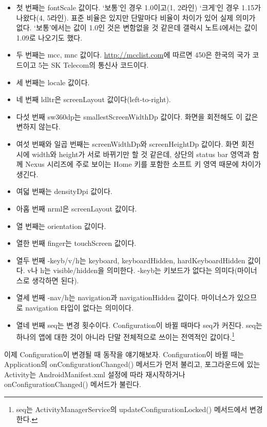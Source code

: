 \begin{itemize}
\item 첫 번째는 fontScale 값이다. `보통'인 경우 1.0이고(1, 2라인) `크게'인 경우 1.15가 나왔다(4, 5라인). 표준 비율은 있지만 단말마다 비율이 차이가 있어 실제 의미가 없다. `보통'에서는 값이 1.0인 것은 변함없을 것 같은데 갤럭시 노트4에서는 값이 1.09로 나오기도 했다.
\item 두 번째는 mcc, mnc 값이다. \url{http://mcclist.com}에 따르면 450은 한국의 국가 코드이고 5는 SK Telecom의 통신사 코드이다.
\item 세 번째는 locale 값이다.
\item 네 번째 ldltr은 screenLayout 값이다(left-to-right).
\item 다섯 번째 sw360dp는 smallestScreenWidthDp 값이다. 화면을 회전해도 이 값은 변하지 않는다.
\item 여섯 번째와 일곱 번째는 screenWidthDp와 screenHeightDp 값이다. 
화면 회전 시에 width와 height가 서로 바뀌기만 할 것 같은데, 상단의 status bar 영역과 함께 Nexus 시리즈에 주로 보이는 Home 키를 포함한 소프트 키 영역 때문에 차이가 생긴다.
\item 여덟 번째는 densityDpi 값이다.
\item 아홉 번째 nrml은 screenLayout 값이다.
\item 열 번째는 orientation 값이다.
\item 열한 번째 finger는 touchScreen 값이다.
\item 열두 번째 -keyb/v/h는 keyboard, keyboardHidden, hardKeyboardHidden 값이다. v나 h는 visible/hidden을 의미한다. 
-keyb는 키보드가 없다는 의미다(마이너스로 생각하면 된다).
\item 열세 번째 -nav/h는 navigation과 navigationHidden 값이다. 마이너스가 있으므로 navigation 타입이 없다는 의미이다.
\item 열네 번째 seq는 변경 횟수이다. Configuration이 바뀔 때마다 seq가 커진다. seq는 하나의 앱에 대한 것이 아니라 단말 전체적으로 쓰이는 전역적인 값이다.\footnote{seq는 ActivityManagerService의 updateConfigurationLocked() 메서드에서 변경한다.}
\end{itemize}

이제 Configuration이 변경될 때 동작을 얘기해보자. Configuration이 바뀔 때는 Application의 onConfigurationChanged() 메서드가 먼저 불리고, 포그라운드에 있는 Activity는 AndroidManifest.xml 설정에 따라 재시작하거나 onConfigurationChanged() 메서드가 불린다.\\

